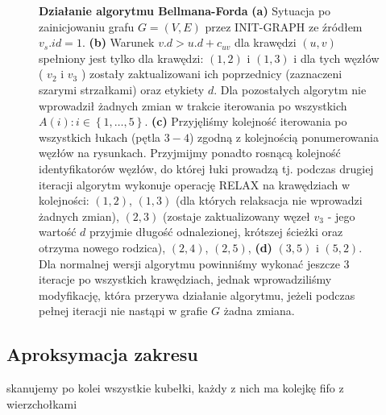 \begin{figure}[!htbp]
\begin{subfigure}[b]{0.33\textwidth}
		\caption{}
	\end{subfigure}
	\caption{\textbf{Działanie algorytmu Bellmana-Forda} \textbf{(a)} Sytuacja po zainicjowaniu grafu $G = \left( V, E \right)$ przez \textsf{INIT-GRAPH} ze źródłem $v_{s}.id = 1$. \textbf{(b)} Warunek $ v.d > u.d + c_{uv} $ dla krawędzi $ \left( u, v \right) $ spełniony jest tylko dla krawędzi: $ \left( 1, 2 \right) $ i $ \left( 1, 3 \right) $ i dla tych węzłów ( $v_{2}$ i $v_{3}$ ) zostały zaktualizowani ich poprzednicy (zaznaczeni szarymi strzałkami) oraz etykiety $d$. Dla pozostałych algorytm nie wprowadził żadnych zmian w trakcie iterowania po wszystkich $ A \left( i \right) : i \in \left\{ 1, \ldots, 5\right\}$. \textbf{(c)} Przyjęliśmy kolejność iterowania po wszystkich łukach (pętla $3-4$) zgodną z kolejnością ponumerowania węzłów na rysunkach. Przyjmijmy ponadto rosnącą kolejność identyfikatorów węzłów, do której łuki prowadzą tj. podczas drugiej iteracji algorytm wykonuje operację \textsf{RELAX} na krawędziach w kolejności: $ \left( 1, 2 \right) $, $ \left( 1, 3 \right) $ (dla których relaksacja nie wprowadzi żadnych zmian), $ \left( 2, 3 \right) $ (zostaje zaktualizowany węzeł $v_{3}$ - jego wartość $d$ przyjmie długość odnalezionej, krótszej ścieżki oraz otrzyma nowego rodzica), $ \left( 2, 4 \right) $, $ \left( 2, 5 \right) $, \textbf{(d)} $ \left( 3, 5 \right) $ i $ \left( 5, 2 \right) $. Dla normalnej wersji algorytmu powinniśmy wykonać jeszcze 3 iteracje po wszystkich krawędziach, jednak wprowadziliśmy modyfikację, która przerywa działanie algorytmu, jeżeli podczas pełnej iteracji nie nastąpi w grafie $G$ żadna zmiana.} \label{fig:exampleBellmanFord}
\end{figure}

\subsection{Aproksymacja zakresu}


skanujemy po kolei wszystkie kubełki, każdy z nich ma kolejkę fifo z wierzchołkami

